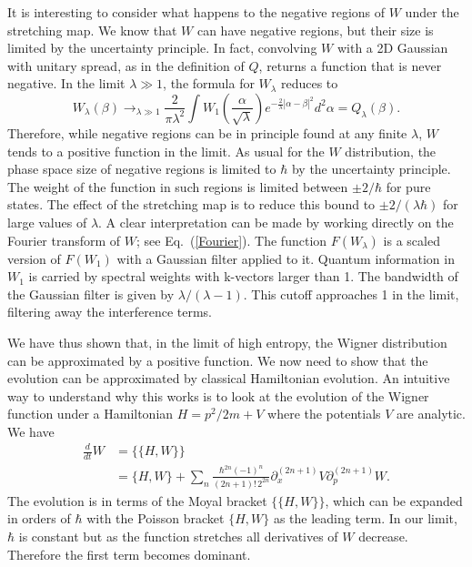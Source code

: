 \documentclass{article}
\begin{document}
It is interesting to consider what happens to the negative regions of $W$ under the stretching map. We know that $W$ can have negative regions, but their size is limited by the uncertainty principle. In fact, convolving $W$ with a 2D Gaussian with unitary spread, as in the definition of $Q$, returns a function that is never negative. In the limit $\lambda\gg1$, the formula for $W_\lambda$ reduces to
\begin{equation}
     W_\lambda(\beta)\rightarrow_{\lambda\gg1}\frac{2}{\pi\lambda^2}\int W_1\left(\frac{\alpha}{\sqrt{\lambda}}\right)e^{-\frac{2}{\lambda}\left|\alpha-\beta\right|^2}d^2\alpha=Q_\lambda(\beta).
\end{equation}
Therefore, while negative regions can be in principle found at any finite $\lambda$, $W$ tends to a positive function in the limit. As usual for the $W$ distribution, the phase space size of negative regions is limited to $\hbar$ by the uncertainty principle. The weight of the function in such regions is limited between $\pm 2/\hbar$ for pure states. The effect of the stretching map is to reduce this bound to $\pm 2/(\lambda\hbar)$ for large values of $\lambda$. A clear interpretation can be made by working directly on the Fourier transform of $W$; see Eq.~(\ref{Fourier}). The function $F(W_\lambda)$ is a scaled version of $F(W_1)$ with a Gaussian filter applied to it. Quantum information in $W_1$ is carried by spectral weights with k-vectors larger than 1. The bandwidth of the Gaussian filter is given by $\lambda/(\lambda-1)$. This cutoff approaches 1 in the limit, filtering away the interference terms.

We have thus shown that, in the limit of high entropy, the Wigner distribution can be approximated by a positive function. We now need to show that the evolution can be approximated by classical Hamiltonian evolution. An intuitive way to understand why this works is to look at the evolution of the Wigner function under a Hamiltonian $H = p^2/2m + V$ where the potentials $V$ are analytic. We have~\cite{hillery1984distribution}
\begin{equation}
\begin{aligned}
    \frac{d}{dt} W &= \{\{H, W\}\} \\
    &= \{H, W\} + \sum_n \frac{\hbar^{2n} (-1)^n}{(2n+1)! \, 2^{2n}} \partial_x^{(2n+1)} V \partial_p^{(2n+1)} W.
\end{aligned}
\end{equation}
The evolution is in terms of the Moyal bracket $\{\{H,W\}\}$, which can be expanded in orders of $\hbar$ with the Poisson bracket $\{H,W\}$ as the leading term. In our limit, $\hbar$ is constant but as the function stretches all derivatives of $W$ decrease. Therefore the first term becomes dominant.
\end{document}

